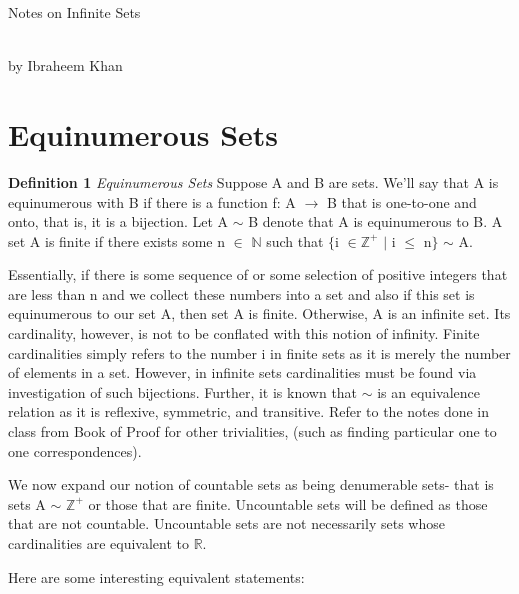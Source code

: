 \documentclass{article}
\begin{document}
\setlength\parindent{24pt}
\begin{center}
\begin{huge}
Notes on Infinite Sets
\end{huge}
\\
by Ibraheem Khan
\end{center}

\section{Equinumerous Sets}

\textbf{Definition 1} \textit{Equinumerous Sets} Suppose A and B are sets. We'll say that A is equinumerous with B if there is a function f: A $\to$ B that is one-to-one and onto, that is, it is a bijection. Let A $\sim$ B denote that A is equinumerous to B. A set A is finite if there exists some n $\in$ $\mathbb{N}$ such that $\{$i $\in \mathbb{Z}^{+}$ $|$ i $\leq$ n$\}$ $\sim$ A.
\\
\par Essentially, if there is some sequence of or some selection of positive integers that are less than n and we collect these numbers into a set and also if this set is equinumerous to our set A, then set A is finite. Otherwise, A is an infinite set. Its cardinality, however, is not to be conflated with this notion of infinity. Finite cardinalities simply refers to the number i in finite sets as it is merely the number of elements in a set. However, in infinite sets cardinalities must be found via investigation of such bijections. Further, it is known that $\sim$ is an equivalence relation as it is reflexive, symmetric, and transitive. Refer to the notes done in class from Book of Proof for other trivialities, (such as finding particular one to one correspondences). 
\\
\par We now expand our notion of countable sets as being denumerable sets- that is sets A $\sim$ $\mathbb{Z}^{+}$ or those that are finite. Uncountable sets will be defined as those that are not countable. Uncountable sets are not necessarily sets whose cardinalities are equivalent to $\mathbb{R}$. 
\\
\par Here are some interesting equivalent statements:
\end{document}
